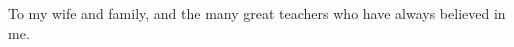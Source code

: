 \documentclass[draft]{nddiss2e}
\begin{document}

\renewcommand{\dedicationname}{DEDICATION} %
\begin{dedication}
To my wife and family, and the many great teachers who have always believed in me.
\end{dedication}

\tableofcontents
\listoffigures
\listoftables


\end{document}
